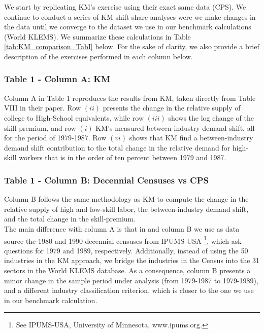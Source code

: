 \documentclass[10pt]{article}
\begin{document}
We start by replicating KM's exercise using their exact same data (CPS). We continue to conduct a series of KM shift-share analyses were we make changes in the data until we converge to the dataset we use in our benchmark calculations (World KLEMS). We summarize these calculations in Table \ref{tab:KM_comparison_TabI} below. For the sake of clarity, we also provide a brief description of the exercises performed in each column below.

\subsubsection*{Table 1 - Column A: KM}
Column A in Table 1 reproduces the results from KM, taken directly from Table VIII in their paper. Row $(ii)$ presents the change in the relative supply of college to High-School equivalents, while row $(iii)$ shows the log change of the skill-premium, and row $(i)$ KM's measured between-industry demand shift, all for the period of 1979-1987. Row $(vi)$ shows that KM find a between-industry demand shift contribution to the total change in the relative demand for high-skill workers that is in the order of ten percent between 1979 and 1987. 

\subsubsection*{Table 1 - Column B: Decennial Censuses vs CPS}
Column B follows the same methodology as KM to compute the change in the relative supply of high and low-skill labor, the between-industry demand shift, and the total change in the skill-premium.\\

The main difference with column A is that in and column B we use as data source the 1980 and 1990 decennial censuses from IPUMS-USA \footnote{See IPUMS-USA, University of Minnesota, www.ipums.org.}, which ask questions for 1979 and 1989, respectively. Additionally, instead of using the 50 industries in the KM approach, we bridge the industries in the Census into the 31 sectors in the World KLEMS database. As a consequence, column B presents a minor change in the sample period under analysis (from 1979-1987 to 1979-1989), and a different industry classification criterion, which is closer to the one we use in our benchmark calculation.\\ 
\end{document}
